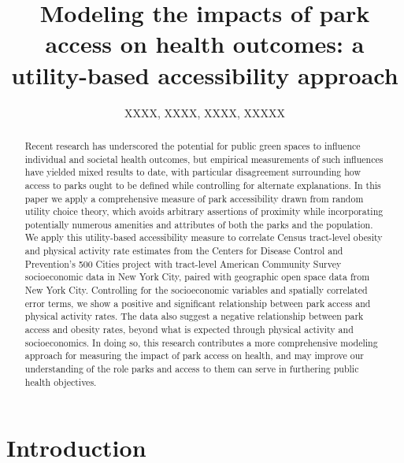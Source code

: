 \documentclass[shortAfour,sageh.bst]{sagej}
\begin{document}
\title{Modeling the impacts of park access on health outcomes: a utility-based
accessibility approach}


\author{XXXX, XXXX, XXXX, XXXXX }




\begin{abstract}
Recent research has underscored the potential for public green spaces to
influence individual and societal health outcomes, but empirical
measurements of such influences have yielded mixed results to date, with
particular disagreement surrounding how access to parks ought to be
defined while controlling for alternate explanations. In this paper we
apply a comprehensive measure of park accessibility drawn from random
utility choice theory, which avoids arbitrary assertions of proximity
while incorporating potentially numerous amenities and attributes of
both the parks and the population. We apply this utility-based
accessibility measure to correlate Census tract-level obesity and
physical activity rate estimates from the Centers for Disease Control
and Prevention's 500 Cities project with tract-level American Community
Survey socioeconomic data in New York City, paired with geographic open
space data from New York City. Controlling for the socioeconomic
variables and spatially correlated error terms, we show a positive and
significant relationship between park access and physical activity
rates. The data also suggest a negative relationship between park access
and obesity rates, beyond what is expected through physical activity and
socioeconomics. In doing so, this research contributes a more
comprehensive modeling approach for measuring the impact of park access
on health, and may improve our understanding of the role parks and
access to them can serve in furthering public health objectives.
\end{abstract}


\maketitle
\clearpage
\hypertarget{introduction}{%
\section{Introduction}\label{introduction}}
\end{document}
